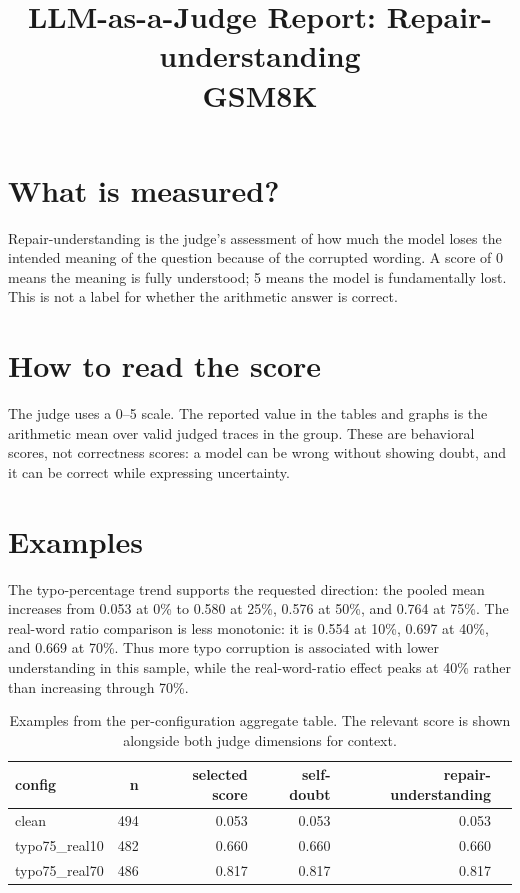 \documentclass[11pt]{article}
\title{LLM-as-a-Judge Report: Repair-understanding\\\large GSM8K}
\date{}
\begin{document}
\maketitle

\section*{What is measured?} Repair-understanding is the judge's assessment of how much the model loses the intended meaning of the question because of the corrupted wording. A score of 0 means the meaning is fully understood; 5 means the model is fundamentally lost. This is not a label for whether the arithmetic answer is correct.

\section*{How to read the score} The judge uses a 0--5 scale. The reported value in the tables and graphs is the arithmetic mean over valid judged traces in the group. These are behavioral scores, not correctness scores: a model can be wrong without showing doubt, and it can be correct while expressing uncertainty.

\section*{Examples} The typo-percentage trend supports the requested direction: the pooled mean increases from 0.053 at 0\% to 0.580 at 25\%, 0.576 at 50\%, and 0.764 at 75\%. The real-word ratio comparison is less monotonic: it is 0.554 at 10\%, 0.697 at 40\%, and 0.669 at 70\%. Thus more typo corruption is associated with lower understanding in this sample, while the real-word-ratio effect peaks at 40\% rather than increasing through 70\%.

\begin{table}[H]
\centering
\caption{Examples from the per-configuration aggregate table. The relevant score is shown alongside both judge dimensions for context.}
\small
\begin{tabular}{lrrrrr}
\toprule
\textbf{config} & \textbf{n} & \textbf{selected score} & \textbf{self-doubt} & \textbf{repair-understanding} \\
\midrule
clean & 494 & 0.053 & 0.053 & 0.053 \\
typo75\_real10 & 482 & 0.660 & 0.660 & 0.660 \\
typo75\_real70 & 486 & 0.817 & 0.817 & 0.817 \\
\bottomrule
\end{tabular}
\end{table}
\end{document}
